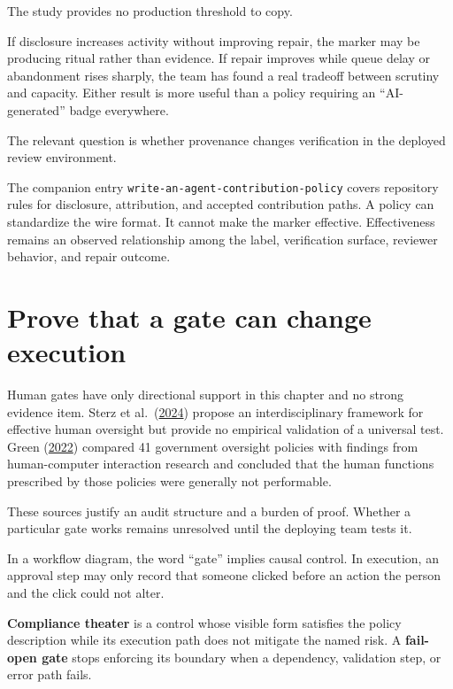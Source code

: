 The study provides no production threshold to copy.

If disclosure increases activity without improving repair, the marker may be producing ritual rather than evidence. If repair improves while queue delay or abandonment rises sharply, the team has found a real tradeoff between scrutiny and capacity. Either result is more useful than a policy requiring an ``AI-generated'' badge everywhere.

The relevant question is whether provenance changes verification in the deployed review environment.

The companion entry \texttt{write-an-agent-contribution-policy} covers repository rules for disclosure, attribution, and accepted contribution paths. A policy can standardize the wire format. It cannot make the marker effective. Effectiveness remains an observed relationship among the label, verification surface, reviewer behavior, and repair outcome.

\section{Prove that a gate can change execution}\label{prove-that-a-gate-can-change-execution}

Human gates have only directional support in this chapter and no strong evidence item. Sterz et al.~(\href{https://arxiv.org/abs/2404.04059}{2024}) propose an interdisciplinary framework for effective human oversight but provide no empirical validation of a universal test. Green (\href{https://arxiv.org/abs/2109.05067}{2022}) compared 41 government oversight policies with findings from human-computer interaction research and concluded that the human functions prescribed by those policies were generally not performable.

These sources justify an audit structure and a burden of proof. Whether a particular gate works remains unresolved until the deploying team tests it.

In a workflow diagram, the word ``gate'' implies causal control. In execution, an approval step may only record that someone clicked before an action the person and the click could not alter.

\textbf{Compliance theater} is a control whose visible form satisfies the policy description while its execution path does not mitigate the named risk. A \textbf{fail-open gate} stops enforcing its boundary when a dependency, validation step, or error path fails.

